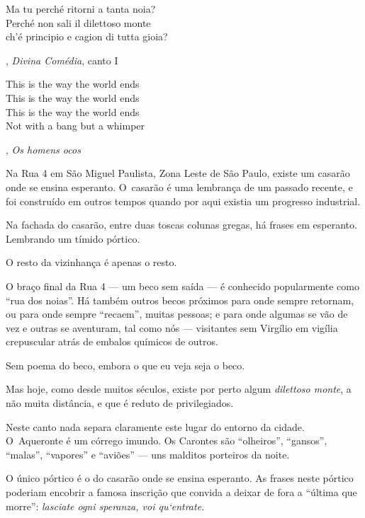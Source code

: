  

\epigraph{Ma tu perché ritorni a tanta noia?\\ Perché non sali il dilettoso
monte\\ ch'é principio e cagion di tutta gioia?}{, \textit{Divina Comédia}, canto I} 



\epigraph{This is the way the world ends\\ This is the way the world ends\\ This
is the way the world ends\\ Not with a bang but a whimper}{, \textit{Os homens ocos}} 

 


Na Rua 4 em São Miguel Paulista, Zona Leste de São Paulo, existe um
casarão onde se ensina esperanto. O~casarão é uma lembrança de um
passado recente, e foi construído em outros tempos quando por aqui
existia um progresso industrial.

Na fachada do casarão, entre duas toscas colunas gregas, há frases em
esperanto. Lembrando um tímido pórtico.

O resto da vizinhança é apenas o resto.

\asterisc{}

O braço final da Rua 4 --- um beco sem saída --- é conhecido
popularmente como ``rua dos noias''. Há também outros becos próximos
para onde sempre retornam, ou para onde sempre ``recaem'', muitas
pessoas; e para onde algumas se vão de vez e outras se aventuram, tal
como nós --- visitantes sem Virgílio em vigília crepuscular atrás de
embalos químicos de outros.

Sem poema do beco, embora o que eu veja seja o beco.

Mas hoje, como desde muitos séculos, existe por perto algum
\emph{dilettoso monte}, a não muita distância, e que é reduto de
privilegiados.

\asterisc{}

Neste canto nada separa claramente este lugar do entorno da cidade. O~Aqueronte é um córrego imundo. Os Carontes são ``olheiros'', ``gansos'',
``malas'', ``vapores'' e ``aviões'' --- uns malditos porteiros da noite.

O único pórtico é o do casarão onde se ensina esperanto. As frases neste
pórtico poderiam encobrir a famosa inscrição que convida a deixar de
fora a ``última que morre'': \emph{lasciate ogni speranza, voi
qu`entrate.}

